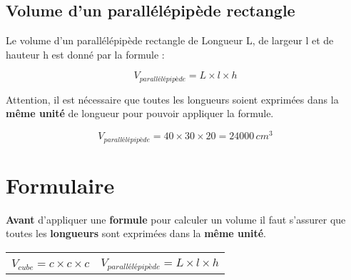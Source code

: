 \begin{pageCours}
\subsection{Volume d'un parallélépipède rectangle}

\begin{Pp}
Le volume d'un parallélépipède rectangle de Longueur L, de largeur l et de hauteur h est donné par la formule :

\[V_{parallélépipède}=L\times l\times h\]

\begin{center}
\end{center}
\end{Pp}

\begin{Rq}
Attention, il est nécessaire que toutes les longueurs soient exprimées dans la \textbf{même unité} de longueur pour pouvoir appliquer la formule.
\end{Rq}

\begin{Ex}
\begin{center}
\end{center}
\[V_{parallélépipède}=40\times 30\times 20=24000\,cm^3\]
\end{Ex}

\section{Formulaire}

\begin{Att}
\textbf{Avant} d'appliquer une \textbf{formule} pour calculer un volume il faut s'assurer que toutes les \textbf{longueurs} sont exprimées dans la \textbf{même unité}.
\end{Att}

\begin{tabular}{M{.5\textwidth}|M{.5\textwidth}}
\begin{center}
\end{center} & 
\begin{center}
\end{center} \\
\[V_{cube}=c\times c\times c\] & \[V_{parallélépipède}=L\times l\times h\]
\end{tabular}


\end{pageCours}
